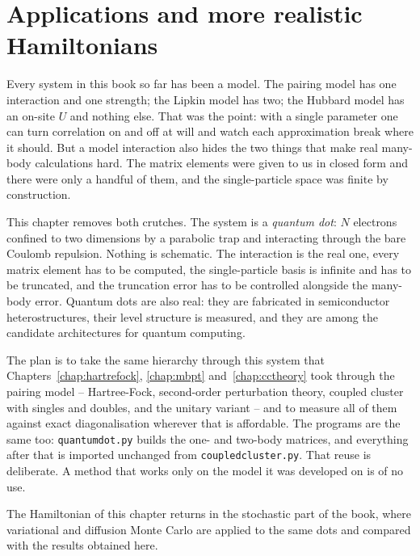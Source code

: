 \chapter{Applications and more realistic Hamiltonians}
\label{chap:applications}

Every system in this book so far has been a model.  The pairing model has one
interaction and one strength; the Lipkin model has two; the Hubbard model has
an on-site $U$ and nothing else.  That was the point: with a single parameter
one can turn correlation on and off at will and watch each approximation break
where it should.  But a model interaction also hides the two things that make
real many-body calculations hard.  The matrix elements were given to us in
closed form and there were only a handful of them, and the single-particle
space was finite by construction.

This chapter removes both crutches.  The system is a \emph{quantum dot}: $N$
electrons confined to two dimensions by a parabolic trap and interacting
through the bare Coulomb repulsion.  Nothing is schematic.  The interaction is
the real one, every matrix element has to be computed, the single-particle
basis is infinite and has to be truncated, and the truncation error has to be
controlled alongside the many-body error.  Quantum dots are also real: they
are fabricated in semiconductor heterostructures, their level structure is
measured, and they are among the candidate architectures for quantum
computing.

The plan is to take the same hierarchy through this system that
Chapters~\ref{chap:hartrefock}, \ref{chap:mbpt} and~\ref{chap:cctheory} took
through the pairing model -- Hartree-Fock, second-order perturbation theory,
coupled cluster with singles and doubles, and the unitary variant -- and to
measure all of them against exact diagonalisation wherever that is affordable.
The programs are the same too: \texttt{quantumdot.py} builds the one- and
two-body matrices, and everything after that is imported unchanged from
\texttt{coupledcluster.py}.  That reuse is deliberate.  A method that works
only on the model it was developed on is of no use.

The Hamiltonian of this chapter returns in the stochastic part of the book,
where variational and diffusion Monte Carlo are applied to the same dots and
compared with the results obtained here.


